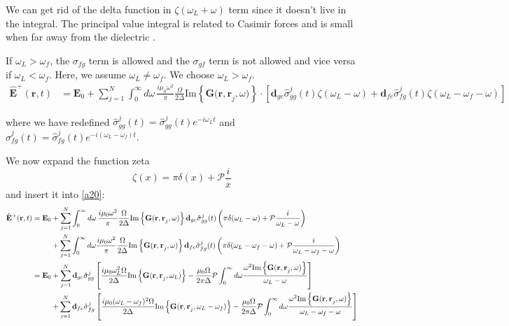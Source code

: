 \documentclass[a4paper, 11pt]{article}
\numberwithin{equation}{section}
\begin{document}
We can get rid of the delta function in $\zeta(\omega_L+\omega)$ term since it doesn't
live in the integral. The principal
value integral is related to Casimir forces \cite{Chang_2014} and is small when far
away from the dielectric \cite{Hung_2013}.

If $\omega_L>\omega_f$, the $\sigma_{fg}$ term is allowed and the $\sigma_{gf}$ term
is not allowed and vice versa if $\omega_L<\omega_f$. Here, we assume
$\omega_L\neq\omega_f$. We choose $\omega_L>\omega_f$.
\begin{equation}\label{a20}
  \begin{aligned}
    \hat{\mathbf{E}}^+(\mathbf{r}, t) &= \mathbf{E}_0 + \sum_{j=1}^N\int_0^\infty
    d\omega\,\frac{i\mu_0\omega^2}{\pi}\frac{\Omega}{2\Delta}\text{Im}
    \left\{\mathbf{G(r, r}_j, \omega)\right\} \cdot \left[\mathbf{d}_{ge}\hat{\sigma}_{gg}^j(t)\zeta(\omega_L-\omega) +
    \mathbf{d}_{fe}\hat{\sigma}_{fg}^j(t)\zeta(\omega_L-\omega_f-\omega)\right]
  \end{aligned}
\end{equation}

where we have redefined $\hat{\sigma}_{gg}^j(t) =
\hat{\sigma}_{gg}^j(t)e^{-i\omega_Lt}$ and $\hat{\sigma}_{fg}^j(t) =
\hat{\sigma}_{fg}^j(t)e^{-i(\omega_L-\omega_f)t}$.

We now expand the function zeta
\begin{equation}
  \zeta(x) = \pi\delta(x) + \mathcal{P}\frac{i}{x}
\end{equation}
and insert it into \ref{a20}:
\begin{align*}
  \hat{\mathbf{E}}^+(\mathbf{r}, t) &= \mathbf{E}_0 + \sum_{j=1}^N \int_0^\infty
  d\omega\, \frac{i\mu_0\omega^2}{\pi}\frac{\Omega}{2\Delta} \text{Im}\left\{
  \mathbf{G(r, r}_j,\omega) \right\}\mathbf{d}_{ge}\hat{\sigma}_{gg}^j(t) \left(
\pi\delta(\omega_L - \omega) + \mathcal{P}\frac{i}{\omega_L - \omega} \right)\\
                                    &\hspace{2.5em}+
\sum_{j=1}^N \int_0^\infty d\omega \frac{i\mu_0\omega^2}{\pi} \frac{\Omega}{2\Delta}
\text{Im}\left\{ \mathbf{G(r, r}_j, \omega) \right\}
\mathbf{d}_{fe}\hat{\sigma}_{fg}^j(t) \left( \pi\delta(\omega_L-\omega_f-\omega) +
\mathcal{P}\frac{i}{\omega_L-\omega_f-\omega} \right)\\ &= \mathbf{E}_0 + \sum_{j=1}^N
\mathbf{d}_{ge}\hat{\sigma}_{gg}^j \left[ \frac{i\mu_0\omega_L^2\Omega}{2\Delta}
\text{Im} \left\{ \mathbf{G(r, r}_j, \omega_L) \right\} -
\frac{\mu_0\Omega}{2\pi\Delta} \mathcal{P} \int_0^\infty d\omega \frac{\omega^2
\text{Im}\left\{ \mathbf{G(r, r}_j, \omega) \right\}}{\omega_L-\omega} \right]\\
                                                        &\hspace{2.5em}+ \sum_{j=1}^N
\mathbf{d}_{fe}\hat{\sigma}_{fg}^j \left[ \frac{i\mu_0(\omega_L-\omega_f)^2\Omega}{2\Delta}
\text{Im} \left\{ \mathbf{G(r, r}_j, \omega_L - \omega_f) \right\} -
\frac{\mu_0\Omega}{2\pi\Delta} \mathcal{P} \int_0^\infty d\omega \frac{\omega^2
\text{Im}\left\{ \mathbf{G(r, r}_j, \omega) \right\}}{\omega_L - \omega_f -\omega} \right]
\end{align*}
\end{document}
